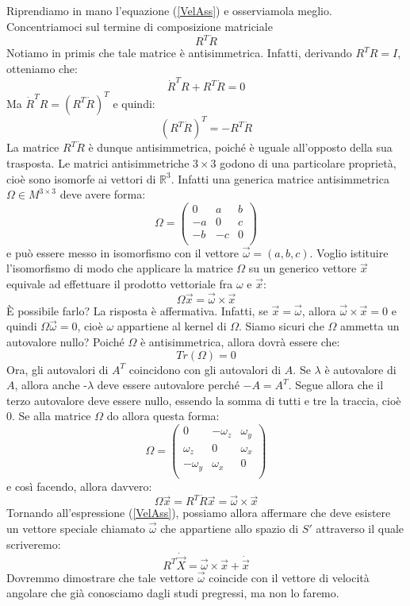 \documentclass[a4paper,openany]{article}
\begin{document}
	Riprendiamo in mano l'equazione (\ref{VelAss}) e osserviamola meglio. Concentriamoci sul termine di composizione matriciale
	$$
	R^{T}\dot{R}
	$$
	Notiamo in primis che tale matrice è antisimmetrica. Infatti, derivando $R^{T}R = I$, otteniamo che:
	$$
	\dot{R}^{T}R + R^{T}\dot{R} = 0
	$$
	Ma $\dot{R}^{T}R = (R^{T}\dot{R})^{T}$ e quindi:
	$$
	(R^{T}\dot{R})^{T} = - R^{T}\dot{R} 
	$$
	La matrice $R^{T}\dot{R}$ è dunque antisimmetrica, poiché è uguale all'opposto della sua trasposta. Le matrici antisimmetriche $3\times3$ godono di una particolare proprietà, cioè sono isomorfe ai vettori di $\mathbb{R}^{3}$. Infatti una generica matrice antisimmetrica $\Omega \in M^{3\times3}$ deve avere forma:
	\begin{equation}
		\Omega = 
		\begin{pmatrix}
			0 & a & b \\
			-a & 0 & c \\
			-b & -c & 0 \\
		\end{pmatrix}
	\end{equation}
	e può essere messo in isomorfismo con il vettore $\vec{\omega} = (a,b,c)$. Voglio istituire l'isomorfismo di modo che applicare la matrice $\Omega$ su un generico vettore $\vec{x}$ equivale ad effettuare il prodotto vettoriale fra $\omega \mbox{ e } \vec{x}$:
	$$
	\Omega \vec{x} = \vec{\omega}\times\vec{x}
	$$
	È possibile farlo? La risposta è affermativa. Infatti, se $\vec{x} = \vec{\omega}$, allora $\vec{\omega}\times\vec{x} = 0$ e quindi $\Omega \vec{\omega} = 0$, cioè $\omega$ appartiene al kernel di $\Omega$. Siamo sicuri che $\Omega$ ammetta un autovalore nullo? Poiché $\Omega$ è antisimmetrica, allora dovrà essere che:
	$$
	Tr(\Omega) = 0
	$$
	Ora, gli autovalori di $A^T$ coincidono con gli autovalori di $A$. Se $\lambda$ è autovalore di $A$, allora anche -$\lambda$ deve essere autovalore perché $-A = A^T$. Segue allora che il terzo autovalore deve essere nullo, essendo la somma di tutti e tre la traccia, cioè 0.
	Se alla matrice $\Omega$ do allora questa forma:
	\begin{equation}
		\Omega = 
		\begin{pmatrix}
			0 & -\omega_z & \omega_y \\
			\omega_z & 0 & \omega_x \\
			-\omega_y & \omega_x & 0 \\
		\end{pmatrix}
	\end{equation}
	e così facendo, allora davvero:
	$$
	\Omega \vec{x} = R^{T}\dot{R}\vec{x} = \vec{\omega}\times\vec{x}
	$$
	Tornando all'espressione (\ref{VelAss}), possiamo allora affermare che deve esistere un vettore speciale chiamato $\vec{\omega}$ che appartiene allo spazio di $S'$ attraverso il quale scriveremo:
	\begin{equation}
		R^{T}\dot{\vec{X}} = \vec{\omega}\times\vec{x} + \dot{\vec{x}}
		\label{VelAss2}
	\end{equation}
	Dovremmo dimostrare che tale vettore $\vec{\omega}$ coincide con il vettore di velocità angolare che già conosciamo dagli studi pregressi, ma non lo faremo.
	
\end{document}
